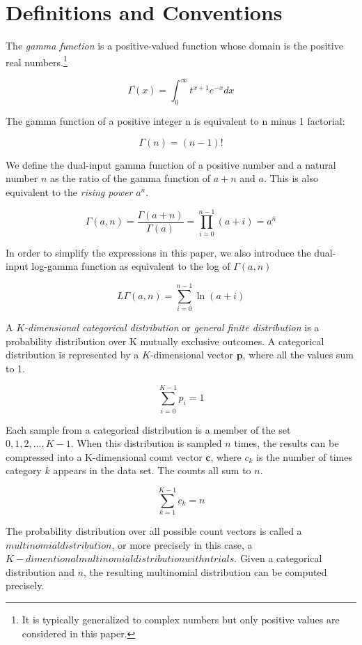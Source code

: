 \documentclass[twoside]{article}
\begin{document}
\section{Definitions and Conventions}

The \textit{gamma function} is a positive-valued function whose domain is the positive real numbers.\footnote{It is typically generalized to complex numbers but only positive values are considered in this paper.}

\[\Gamma(x)=\int_0^\infty t^{x+1}e^{-x}dx\]

The gamma function of a positive integer n is equivalent to n minus 1 factorial:

\[\Gamma(n)=(n-1)!\]

We define the dual-input gamma function of a positive number and a natural number \(n\) as the ratio of the gamma function of \(a + n\) and \(a\). This is also equivalent to the \textit{rising power}\cite{concrete} \(a^{\bar{n}}\).

\[\Gamma(a,n)=\frac{\Gamma(a+n)}{\Gamma(a)}=\prod_{i=0}^{n-1}(a+i)=a^{\bar{n}}\]

In order to simplify the expressions in this paper, we also introduce the dual-input log-gamma function as equivalent to the log of \(\Gamma(a, n)\)

\[L\Gamma(a,n)=\sum_{i=0}^{n-1}\ln(a+i)\]

A \textit{\(K\)-dimensional categorical distribution} or \textit{general finite distribution}\cite{ng} is a probability distribution over K mutually exclusive outcomes.  A categorical distribution is represented by a \(K\)-dimensional vector $\mathbf{p}$, where all the values sum to 1.

\[\sum_{i=0}^{K-1}p_i=1\]

Each sample from a categorical distribution is a member of the set \({0, 1, 2, ..., K-1}\). When this distribution is sampled \(n\) times, the results can be compressed into a  K-dimensional count vector \(\mathbf{c}\), where \(c_k\) is the number of times category \(k\) appears in the data set.  The counts all sum to $n$.

\[\sum_{k=1}^{K-1}c_k=n\]

The probability distribution over all possible count vectors is called a \(multinomial distribution\), or more precisely in this case, a \(K-dimentional multinomial distribution with n trials\). Given a categorical distribution and \(n\), the resulting multinomial distribution can be computed precisely.
\end{document}
